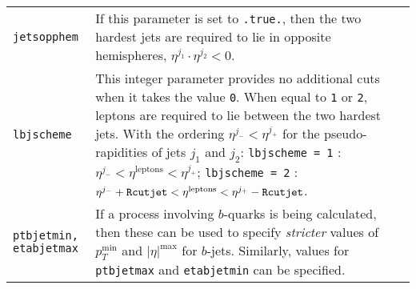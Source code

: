 \begin{longtable}{p{1.5cm}p{12cm}}
		{\tt jetsopphem} & If this parameter is set to {\tt .true.},
		then the two hardest jets are required to lie in opposite hemispheres,
		$\eta^{j_1} \cdot \eta^{j_2} < 0$. \\
		
		{\tt lbjscheme} & This integer parameter provides no
		additional cuts when it takes the value {\tt 0}. When equal to
		{\tt 1} or {\tt 2}, leptons are required to lie between the two
		hardest jets. With the ordering $\eta^{j_-} < \eta^{j_+}$ for the
		pseudo-rapidities of jets $j_1$ and $j_2$:
		{\tt lbjscheme = 1} : 
		$\eta^{j_-} < \eta^{\mathrm{leptons}} < \eta^{j_+}$;
		{\tt lbjscheme = 2} :
		$\eta^{j_-}+{\tt Rcutjet} < \eta^{\mathrm{leptons}} < \eta^{j_+}-{\tt Rcutjet}$. \\
		
		{\tt ptbjetmin, etabjetmax} & If a process involving $b$-quarks is being calculated, then these can
		be used to specify {\em stricter} values of $p_T^{\mathrm{min}}$
		and $|\eta|^{\mathrm{max}}$ for $b$-jets. Similarly, values for \texttt{ptbjetmax} and \texttt{etabjetmin} can be 
		specified. \\
		\bottomrule
	\end{longtable}
